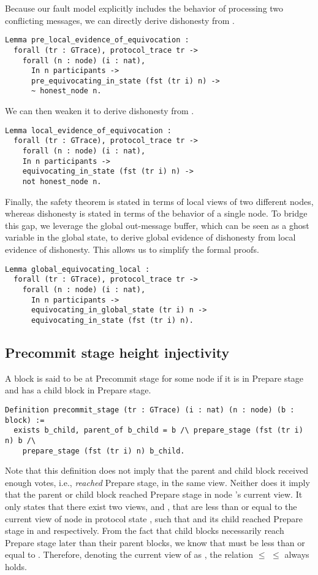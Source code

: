 \documentclass{easychair}
\begin{document}
Because our fault model explicitly includes the behavior of processing two conflicting  messages, we can directly derive dishonesty from . 
\begin{lstlisting}[language=Coq]
Lemma pre_local_evidence_of_equivocation :
  forall (tr : GTrace), protocol_trace tr ->
    forall (n : node) (i : nat),
      In n participants ->
      pre_equivocating_in_state (fst (tr i) n) ->
      ~ honest_node n.
\end{lstlisting}
We can then weaken it to derive dishonesty from . 
\begin{lstlisting}[language=Coq]
Lemma local_evidence_of_equivocation :
  forall (tr : GTrace), protocol_trace tr ->
    forall (n : node) (i : nat),
    In n participants ->
    equivocating_in_state (fst (tr i) n) ->
    not honest_node n.
\end{lstlisting}
\noindent
Finally, the safety theorem is stated in terms of local views of two different nodes, whereas dishonesty is stated in terms of the behavior of a single node. To bridge this gap, we leverage the global out-message buffer, which can be seen as a ghost variable in the global state, to derive global evidence of dishonesty from local evidence of dishonesty. This allows us to simplify the formal proofs.
\begin{lstlisting}[language=Coq]
Lemma global_equivocating_local :
  forall (tr : GTrace), protocol_trace tr ->
    forall (n : node) (i : nat),
      In n participants ->
      equivocating_in_global_state (tr i) n ->
      equivocating_in_state (fst (tr i) n).
\end{lstlisting}

\subsection{Precommit stage height injectivity}
A block is said to be at Precommit stage for some node if it is in Prepare stage and has a child block in Prepare stage. 
\begin{lstlisting}[language=Coq]
Definition precommit_stage (tr : GTrace) (i : nat) (n : node) (b : block) :=
  exists b_child, parent_of b_child = b /\ prepare_stage (fst (tr i) n) b /\
    prepare_stage (fst (tr i) n) b_child.
\end{lstlisting}
Note that this definition does not imply that the parent and child block received enough votes, i.e., \textit{reached} Prepare stage, in the same view. Neither does it imply that the parent or child block reached Prepare stage in node 's current view. It only states that there exist two views,  and , that are less than or equal to the current view of node  in protocol state , such that  and its child reached Prepare stage in  and  respectively. From the fact that child blocks necessarily reach Prepare stage later than their parent blocks, we know that  must be less than or equal to . Therefore, denoting the current view of  as , the relation  $\leq$  $\leq$  always holds. 
\end{document}

